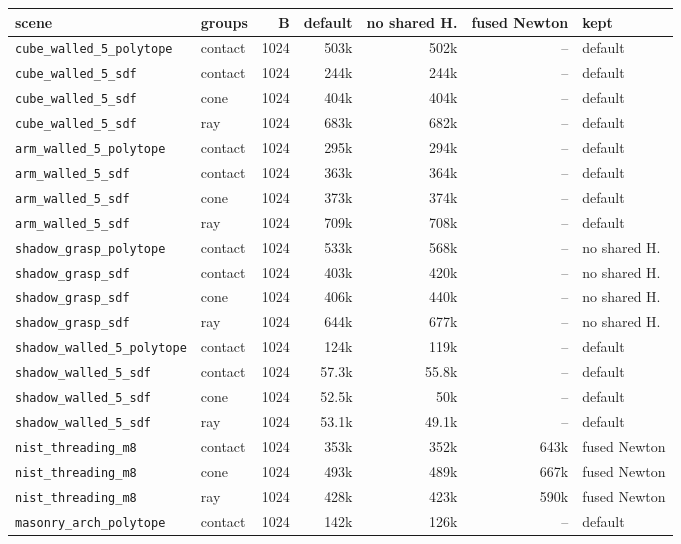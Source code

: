 \begin{longtable}{@{}llrrrrl@{}}
\toprule
scene & groups & B & default & no shared H. & fused Newton & kept \\
\midrule
\endhead
\texttt{cube\_walled\_5\_polytope} & contact & 1024 & 503k & 502k & -- & default \\
\texttt{cube\_walled\_5\_sdf} & contact & 1024 & 244k & 244k & -- & default \\
\texttt{cube\_walled\_5\_sdf} & cone & 1024 & 404k & 404k & -- & default \\
\texttt{cube\_walled\_5\_sdf} & ray & 1024 & 683k & 682k & -- & default \\
\texttt{arm\_walled\_5\_polytope} & contact & 1024 & 295k & 294k & -- & default \\
\texttt{arm\_walled\_5\_sdf} & contact & 1024 & 363k & 364k & -- & default \\
\texttt{arm\_walled\_5\_sdf} & cone & 1024 & 373k & 374k & -- & default \\
\texttt{arm\_walled\_5\_sdf} & ray & 1024 & 709k & 708k & -- & default \\
\texttt{shadow\_grasp\_polytope} & contact & 1024 & 533k & 568k & -- & no shared H. \\
\texttt{shadow\_grasp\_sdf} & contact & 1024 & 403k & 420k & -- & no shared H. \\
\texttt{shadow\_grasp\_sdf} & cone & 1024 & 406k & 440k & -- & no shared H. \\
\texttt{shadow\_grasp\_sdf} & ray & 1024 & 644k & 677k & -- & no shared H. \\
\texttt{shadow\_walled\_5\_polytope} & contact & 1024 & 124k & 119k & -- & default \\
\texttt{shadow\_walled\_5\_sdf} & contact & 1024 & 57.3k & 55.8k & -- & default \\
\texttt{shadow\_walled\_5\_sdf} & cone & 1024 & 52.5k & 50k & -- & default \\
\texttt{shadow\_walled\_5\_sdf} & ray & 1024 & 53.1k & 49.1k & -- & default \\
\texttt{nist\_threading\_m8} & contact & 1024 & 353k & 352k & 643k & fused Newton \\
\texttt{nist\_threading\_m8} & cone & 1024 & 493k & 489k & 667k & fused Newton \\
\texttt{nist\_threading\_m8} & ray & 1024 & 428k & 423k & 590k & fused Newton \\
\texttt{masonry\_arch\_polytope} & contact & 1024 & 142k & 126k & -- & default \\

\end{longtable}
